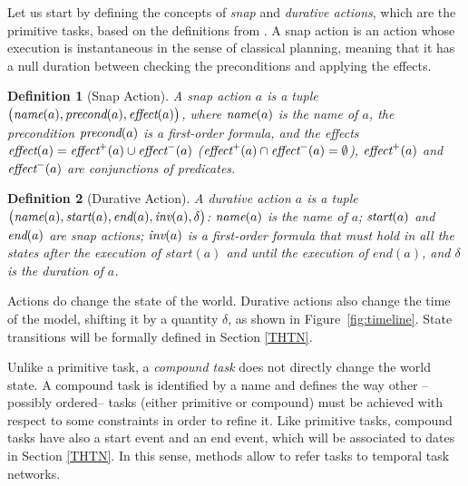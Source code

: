 \documentclass[letterpaper]{article} %
\newtheorem{definition}{Definition}
\newcommand{\name}{\text{\it name}}
\newcommand{\pre}{\text{\it precond}}
\newcommand{\effect}{\text{\it effect}}
\newcommand{\add}{\text{\it effect}^{+}}
\newcommand{\del}{\text{\it effect}^{-}}
\newcommand{\tstart}{\text{\it start}}
\newcommand{\tend}{\text{\it end}}
\newcommand{\tinv}{\text{\it inv}}
\begin{document}
 Let us start by defining the concepts of {\it snap} and {\it durative actions}, which are the primitive tasks, based on the definitions from \citet{abdulaziz22}. A snap action is an action whose execution is instantaneous in the sense of classical planning, meaning that it has a null duration %
 between checking the preconditions and applying the effects. %
 \begin{definition}[Snap Action]\label{def:snap} A \emph{snap action} $a$ is a tuple $\bigl(\name(a), \pre(a), \effect(a) \bigr)$, where $\name(a)$ is the name of $a$, the precondition $\pre(a)$ is a first-order formula, %
   and the effects $\effect(a) = \add(a) \cup \del(a)$ ($\add(a) \cap \del(a) = \emptyset$), $\add(a)$ and $\del(a)$ are conjunctions of predicates.

\end{definition}

\begin{definition}[Durative Action]\label{def:dur}
  A \emph{durative action} $a$ is a tuple $\bigl(\name(a), \tstart(a), \tend(a), \tinv(a), \delta\bigr)$: $\name(a)$ is the name of $a$; $\tstart(a)$ and $\tend(a)$ are snap actions; $\tinv(a)$ is a first-order formula that must hold in all the states after the execution of $start(a)$ and until the execution of $end(a)$, %
  and $\delta$ is the duration of $a$. %
\end{definition}
Actions do change the state of the world. Durative actions also change the time of the model, shifting it by a quantity $\delta$, as shown in Figure~\ref{fig:timeline}.
State transitions will be formally defined in Section \ref{THTN}.  %

Unlike a primitive task, %
 a {\it compound task} does not directly  change the world state.
A compound task is identified by a name and defines the way other --possibly ordered-- tasks (either primitive or compound) must be achieved with respect to some constraints in order to refine it.
 Like primitive tasks, compound tasks have also a start event and an end event, which will be associated to dates in Section \ref{THTN}. %
In this sense, methods allow to refer tasks to temporal task networks.
\end{document}
